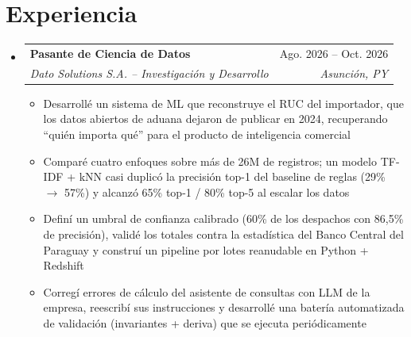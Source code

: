 \documentclass[letterpaper,11pt]{article}
\makeatletter
\newcommand{\resumeItem}[1]{
  \item\small{
    {#1 \vspace{-2pt}}
  }
}
\newcommand{\resumeSubheading}[4]{
  \vspace{-2pt}\item
    \begin{tabular*}{0.97\textwidth}[t]{l@{\extracolsep{\fill}}r}
      \textbf{#1} & #2 \\
      \textit{\small#3} & \textit{\small #4} \\
    \end{tabular*}\vspace{-7pt}
}
\newcommand{\resumeSubHeadingListStart}{\begin{itemize}[leftmargin=0.15in, label={}]}
\newcommand{\resumeSubHeadingListEnd}{\end{itemize}}
\newcommand{\resumeItemListStart}{\begin{itemize}}
\newcommand{\resumeItemListEnd}{\end{itemize}\vspace{-5pt}}
\makeatother
\begin{document}
\section{Experiencia}
  \resumeSubHeadingListStart
    \resumeSubheading
      {Pasante de Ciencia de Datos}{Ago. 2026 -- Oct. 2026}
      {Dato Solutions S.A. -- Investigación y Desarrollo}{Asunción, PY}
      \resumeItemListStart
        \resumeItem{Desarrollé un sistema de ML que reconstruye el RUC del importador, que los datos abiertos de aduana dejaron de publicar en 2024, recuperando ``quién importa qué'' para el producto de inteligencia comercial}
        \resumeItem{Comparé cuatro enfoques sobre más de 26M de registros; un modelo TF-IDF + kNN casi duplicó la precisión top-1 del baseline de reglas (29\% $\rightarrow$ 57\%) y alcanzó 65\% top-1 / 80\% top-5 al escalar los datos}
        \resumeItem{Definí un umbral de confianza calibrado (60\% de los despachos con 86,5\% de precisión), validé los totales contra la estadística del Banco Central del Paraguay y construí un pipeline por lotes reanudable en Python + Redshift}
        \resumeItem{Corregí errores de cálculo del asistente de consultas con LLM de la empresa, reescribí sus instrucciones y desarrollé una batería automatizada de validación (invariantes + deriva) que se ejecuta periódicamente}
      \resumeItemListEnd
  \resumeSubHeadingListEnd

\end{document}
